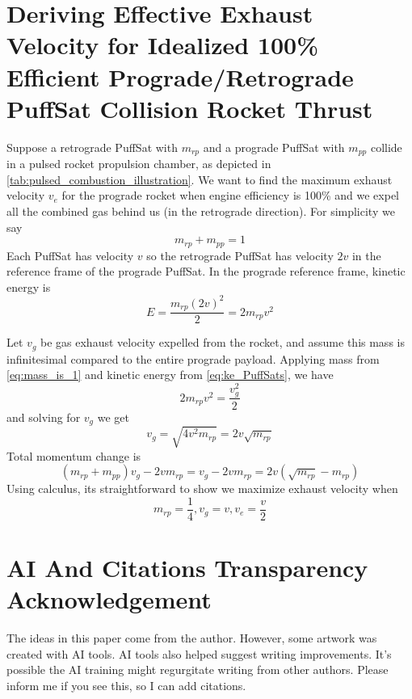 \documentclass{article}
\begin{document}
\section{Deriving Effective Exhaust Velocity for Idealized 100\% Efficient Prograde/Retrograde PuffSat Collision Rocket Thrust}\label{sec:dv_effective}
Suppose a retrograde PuffSat with $m_{rp}$ and a prograde PuffSat with $m_{pp}$ collide in a pulsed rocket propulsion chamber, as depicted in \autoref{tab:pulsed_combustion_illustration}.  We want to find the maximum exhaust velocity $v_e$ for the prograde rocket  when engine efficiency is 100\% and we expel all the combined gas behind us (in the retrograde direction).   For simplicity we say 
\begin{equation}
m_{rp} + m_{pp} = 1\label{eq:mass_is_1}
\end{equation} 
Each PuffSat has velocity $v$ so the retrograde PuffSat has velocity $2v$ in the reference frame of the prograde PuffSat.   In the prograde reference frame, kinetic energy is
\begin{equation}
E = \frac{m_{rp} (2v)^2}{2} = 2m_{rp}v^2\label{eq:ke_PuffSats}
\end{equation}

Let $v_g$ be gas exhaust velocity expelled from the rocket, and assume this mass is infinitesimal compared to the entire prograde payload.  Applying mass from \autoref{eq:mass_is_1}
 and kinetic energy from \autoref{eq:ke_PuffSats}, we have 
 \begin{equation}
 2m_{rp}v^2= \frac{v_g^2}{2}
 \end{equation}
 and solving for $v_g$ we get 
 \begin{equation}
 v_g = \sqrt{4v^2m_{rp}} = 2v\sqrt{m_{rp}} \label{eq:vg_result}
 \end{equation}
 Total momentum change is 
 \[(m_{rp} + m_{pp})v_g - 2vm_{rp} = v_g-2vm_{rp} = 2v(\sqrt{m_{rp}} - m_{rp}) \]
 Using calculus, its straightforward to show we maximize exhaust velocity when 
 \begin{equation}
 m_{rp} = \frac{1}{4}, \label{eq:max_m_rp}
 v_g = v,
 v_e= \frac{v}{2}
 \end{equation}

 \section{AI And Citations Transparency Acknowledgement}
 The ideas in this paper come from the author.  However, some artwork was created with AI tools.  AI tools also helped suggest writing improvements.  It's possible the AI training might regurgitate writing from other authors.   Please inform me if you see this, so I can add citations.  
\end{document}
